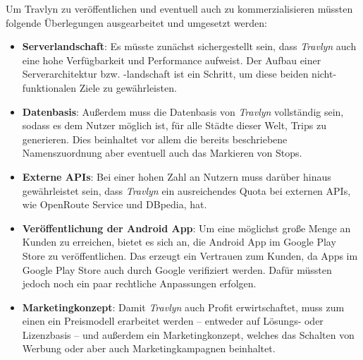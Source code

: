 		Um Travlyn zu veröffentlichen und eventuell auch zu kommerzialisieren müssten folgende Überlegungen ausgearbeitet und umgesetzt werden:
		
		\begin{itemize}
			\item \textbf{Serverlandschaft}: Es müsste zunächst sichergestellt sein, dass \textit{Travlyn} auch eine hohe Verfügbarkeit und Performance aufweist. Der Aufbau einer Serverarchitektur bzw. -landschaft ist ein Schritt, um diese beiden nicht-funktionalen Ziele zu gewährleisten. 
			\item \textbf{Datenbasis}: Außerdem muss die Datenbasis von \textit{Travlyn} vollständig sein, sodass es dem Nutzer möglich ist, für alle Städte dieser Welt, Trips zu generieren. Dies beinhaltet vor allem die bereits beschriebene Namenszuordnung aber eventuell auch das Markieren von Stops.
			\item \textbf{Externe \acs{API}s}: Bei einer hohen Zahl an Nutzern muss darüber hinaus gewährleistet sein, dass \textit{Travlyn} ein ausreichendes Quota bei externen \acs{API}s, wie OpenRoute Service und DBpedia, hat. 
			\item \textbf{Veröffentlichung der Android App}: Um eine möglichst große Menge an Kunden zu erreichen, bietet es sich an, die Android App im Google Play Store zu veröffentlichen. Das erzeugt ein Vertrauen zum Kunden, da Apps im Google Play Store auch durch Google verifiziert werden. Dafür müssten jedoch noch ein paar rechtliche Anpassungen erfolgen. 
			\item \textbf{Marketingkonzept}: Damit \textit{Travlyn} auch Profit erwirtschaftet, muss zum einen ein Preismodell erarbeitet werden -- entweder auf Lösungs- oder Lizenzbasis -- und außerdem ein Marketingkonzept, welches das Schalten von Werbung oder aber auch Marketingkampagnen beinhaltet. 
		\end{itemize}
	
		
	